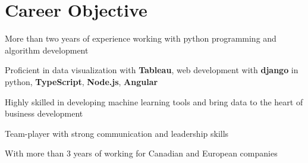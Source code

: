 \documentclass[letter,11pt]{article}
\begin{document}

\section{Career Objective}
\begin{zitemize}
	\item More than two years of experience working with python programming and algorithm development
	\item Proficient in data visualization with \textbf{Tableau}, web development with \textbf{django} in python, \textbf{TypeScript}, \textbf{Node.js}, \textbf{Angular}
	\item Highly skilled in developing machine learning tools and bring data to the heart of business development
	\item Team-player with strong communication and leadership skills
	\item With more than 3 years of working for Canadian and European companies
\end{zitemize}
\end{document}
